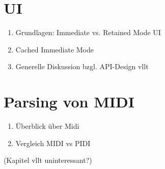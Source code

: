\section{UI} \label{vorgehenSW-UI}
\begin{enumerate}
    \item Grundlagen: Immediate vs. Retained Mode UI
    \item Cached Immediate Mode
    \item Generelle Diskussion bzgl. API-Design vllt
\end{enumerate}

\section{Parsing von MIDI} \label{vorgehenSW-MIDI}
\begin{enumerate}
    \item Überblick über Midi
    \item Vergleich MIDI vs PIDI
\end{enumerate}
(Kapitel vllt uninteressant?)